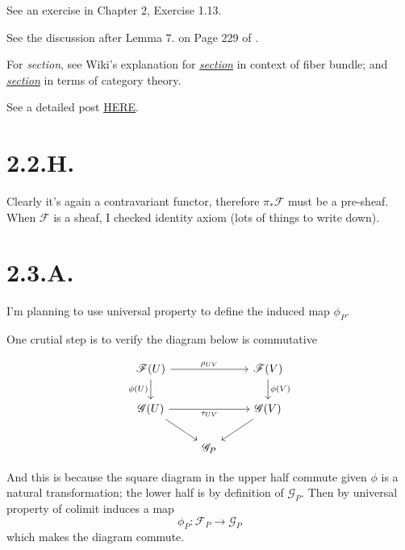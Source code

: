 See an exercise in \cite{hartshorne2013algebraic} Chapter 2, Exercise 1.13.

See the discussion after Lemma 7. on Page 229 of \cite{bosch2013algebraic}.

For \textit{section}, see Wiki's explanation for \href{https://en.wikipedia.org/wiki/Section_(fiber_bundle)}{\textit{section}} in context of fiber bundle; and \href{https://en.wikipedia.org/wiki/Section_(category_theory)}{\textit{section}} in terms of category theory.

See a detailed post \href{https://math.stackexchange.com/questions/3625209/section-of-a-presheaf-can-be-viewed-as-functions}{HERE}.

\section{2.2.H.}
Clearly it's again a contravariant functor, therefore $\pi_{\ast}\mathscr F$ must be a pre-sheaf. When $\mathscr F$ is a sheaf, I checked identity axiom (lots of things to write down).

\section{2.3.A.}

I'm planning to use universal property to define the induced map $\phi_P$.

One crutial step is to verify the diagram below is commutative

\[\begin{tikzcd}
	{\mathscr F(U)} && {\mathscr F(V)} \\
	{\mathscr G(U)} && {\mathscr G(V)} \\
	& {\mathscr G_P}
	\arrow["{\phi(U)}"', from=1-1, to=2-1]
	\arrow["{\rho_{UV}}", from=1-1, to=1-3]
	\arrow["{\tau_{UV}}"', from=2-1, to=2-3]
	\arrow["{\phi(V)}", from=1-3, to=2-3]
	\arrow[from=2-1, to=3-2]
	\arrow[from=2-3, to=3-2]
\end{tikzcd}\]

And this is because the square diagram in the upper half commute given $\phi$ is a natural transformation; the lower half is by definition of $\mathscr G_P$. Then by universal property of colimit induces a map
\[\phi_P:\mathscr F_P\to\mathscr G_P\] which makes the diagram commute.

